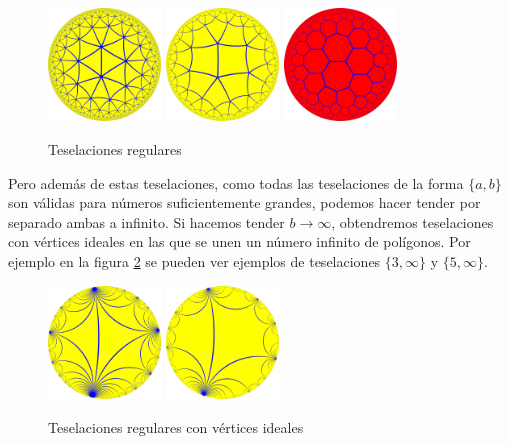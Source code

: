 \documentclass{article}
\theoremstyle{plain}
\theoremstyle{definition}
\theoremstyle{remark}
\begin{document}
\begin{figure}[ht!]
  \centering
  \includegraphics[width=30mm]{./tiling-3-7.png}
  \includegraphics[width=30mm]{./tiling-4-5.png}
  \includegraphics[width=30mm]{./tiling-7-3.png}
  \caption{Teselaciones regulares \label{tiling}}
\end{figure}

Pero además de estas teselaciones, como todas las teselaciones de
la forma $\{a,b\}$ son válidas para números suficientemente grandes,
podemos hacer tender por separado ambas a infinito. Si hacemos tender
$b \to \infty$, obtendremos teselaciones con vértices ideales en las
que se unen un número infinito de polígonos. Por ejemplo en la
figura \ref{tiling2} se pueden ver ejemplos de teselaciones $\{3,\infty\}$
y $\{5,\infty\}$.

\begin{figure}[ht!]
  \centering
  \includegraphics[width=30mm]{./tiling-3-i.png}
  \includegraphics[width=30mm]{./tiling-5-i.png}
  \caption{Teselaciones regulares con vértices ideales \label{tiling2}}
\end{figure}
\end{document}
